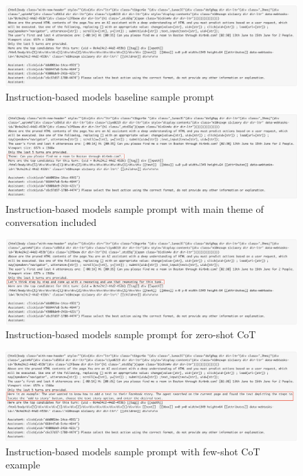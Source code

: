 \documentclass[11pt]{article}
\begin{document}
\begin{figure}[ht]
\includegraphics[width=\textwidth]{prompt_samples/Instruct-base-sample.png}
\caption{Instruction-based models baseline sample prompt}\label{fig:fig13}
\centering
\end{figure}
\begin{figure}[ht]
\includegraphics[width=\textwidth]{prompt_samples/Instruct-history-sample.png}
\caption{Instruction-based models sample prompt with main theme of conversation included} \label{fig:fig14}
\centering
\end{figure}
\begin{figure}[ht]
\includegraphics[width=\textwidth]{prompt_samples/Instruct-zero-shot-sample.png}
\caption{Instruction-based models sample prompt for zero-shot CoT} \label{fig:fig15}
\centering
\end{figure}

\clearpage
\begin{figure}[ht]
\includegraphics[width=\textwidth]{prompt_samples/Instruct-few-shot-sample.png}
\caption{Instruction-based models sample prompt with few-shot CoT example} \label{fig:fig16}
\centering
\end{figure}
\end{document}
